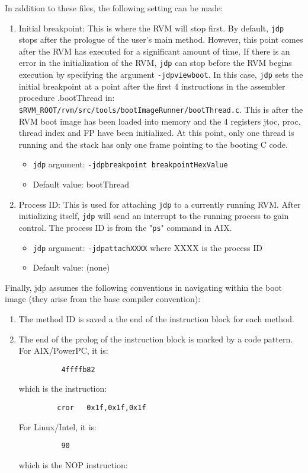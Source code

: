 In addition to these files, the following setting can be made:

\begin{enumerate}
\item Initial breakpoint:  
   This is where the RVM will stop first.  By default, {\tt jdp} stops
   after the prologue of the user's main method.  However, this point
   comes after the RVM has executed for a significant amount of time.
   If there is an error in the initialization of the RVM, {\tt jdp} can stop
   before the RVM begins execution by specifying the argument {\tt -jdpviewboot}.
   In this case, {\tt jdp} sets the initial breakpoint at a point after the
   first 4 instructions in the assembler procedure .bootThread in:
        {\tt \$RVM\_ROOT/rvm/src/tools/bootImageRunner/bootThread.c}.
   This is after the RVM boot image has been loaded into memory and
   the 4 registers jtoc, proc, thread index and FP have been initialized.
   At this point, only one thread is running and the stack has only 
   one frame pointing to the booting C code.
\begin{itemize}
\item   {\tt jdp} argument:     {\tt -jdpbreakpoint breakpointHexValue}
\item    Default value:         bootThread
\end{itemize}

\item Process ID:
   This is used for attaching {\tt jdp} to a currently running RVM.  After 
   initializing itself, {\tt jdp} will send an interrupt to the running process 
   to gain control.  The process ID is from the "{\tt ps}" command in AIX.
\begin{itemize}
\item   {\tt jdp} argument:     {\tt -jdpattachXXXX} where XXXX is the process ID
\item    Default value:         (none)
\end{itemize}
\end{enumerate}


Finally, jdp assumes the following conventions in navigating within the 
boot image (they arise from the base compiler convention):

\begin{enumerate}
\item The method ID is saved a the end of the instruction block for each
   method.

\item The end of the prolog of the instruction block is marked by a code pattern.
For AIX/PowerPC, it is:
\begin{verbatim}
          4ffffb82      
\end{verbatim}
   which is the instruction:

\begin{verbatim}
         cror   0x1f,0x1f,0x1f
\end{verbatim}
For Linux/Intel, it is:
\begin{verbatim}
          90
\end{verbatim}
   which is the NOP instruction:
\end{enumerate}


